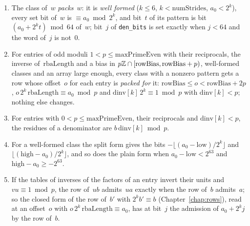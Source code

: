 \begin{lemma}\label{lem:packing}
  \leanok
  \begin{enumerate}
    \item The class of~$w$ \emph{packs}~$w$: it is \emph{well formed} ($k \le 6$,
      $k < \mathrm{numStrides}$, $a_0 < 2^k$), every set bit of~$w$ is $\equiv a_0 \bmod 2^k$, and
      bit~$t$ of its pattern is bit $(a_0 + 2^k t) \bmod 64$ of~$w$; bit~$j$ of \verb|den_bits| is
      set exactly when $j < 64$ and the word of~$j$ is not~$0$.
    \item For entries of odd moduli $1 < p \le \mathrm{maxPrimeEven}$ with their reciprocals, the
      inverse of~$\mathrm{rbaLength}$ and a bias in $p\mathbb{Z} \cap [\mathrm{rowBias}, \mathrm{rowBias}
      + p)$, well-formed classes and an array large enough, every class with a nonzero pattern gets
      a row whose offset~$o$ for each entry is \emph{packed for} it: $\mathrm{rowBias} \le o <
      \mathrm{rowBias} + 2p$, $o\, 2^k\,\mathrm{rbaLength} \equiv a_0 \bmod p$ and
      $\mathrm{dinv}[k]\, 2^k \equiv 1 \bmod p$ with $\mathrm{dinv}[k] < p$; nothing else changes.
    \item For entries with $0 < p \le \mathrm{maxPrimeEven}$, their reciprocals and
      $\mathrm{dinv}[k] < p$, the residues of a denominator are $b\,\mathrm{dinv}[k] \bmod p$.
    \item For a well-formed class the split form gives the bits $-\lfloor (a_0 - \mathrm{low})/2^k
      \rfloor$ and $\lfloor (\mathrm{high} - a_0)/2^k \rfloor$, and so does the plain form when
      $a_0 - \mathrm{low} < 2^{63}$ and $\mathrm{high} - a_0 \ge -2^{63}$.
    \item If the tables of inverses of the factors of an entry invert their units and
      $v u \equiv 1 \bmod p$, the row of~$u b$ admits~$u a$ exactly when the row of~$b$
      admits~$a$; so the closed form of the row of~$b'$ with $2^k b' \equiv b$
      (Chapter~\ref{chap:rows}), read at an offset~$o$ with $o\, 2^k\,\mathrm{rbaLength} \equiv
      a_0$, has at bit~$j$ the admission of $a_0 + 2^k j$ by the row of~$b$.
  \end{enumerate}
\end{lemma}

